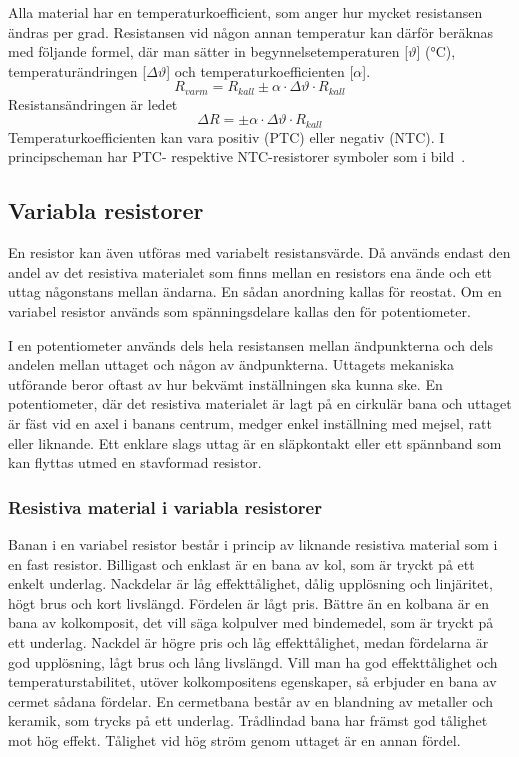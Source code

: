 Alla material har en temperaturkoefficient, som anger hur mycket resistansen
ändras per grad. Resistansen vid någon annan temperatur kan därför beräknas med
följande formel, där man sätter in begynnelsetemperaturen [\(\vartheta\)]
(\unit{\degreeCelsius}), temperaturändringen [\(\Delta \vartheta\)] och
temperaturkoefficienten [\(\alpha\)].
\[R_{varm} = R_{kall} \pm \alpha \cdot \Delta \vartheta \cdot R_{kall}\]
Resistansändringen är ledet
\[ \Delta R = \pm \alpha \cdot \Delta \vartheta \cdot R_{kall}\]
Temperaturkoefficienten kan vara positiv (PTC) eller negativ (NTC).
I principscheman har PTC- respektive NTC-resistorer symboler som i bild~.


\subsection{Variabla resistorer}

En resistor kan även utföras med variabelt resistansvärde. Då används endast
den andel av det resistiva materialet som finns mellan en resistors ena ände
och ett uttag någonstans mellan ändarna. En sådan anordning kallas för reostat.
Om en variabel resistor används som spänningsdelare kallas den för
potentiometer.

I en potentiometer används dels hela resistansen mellan ändpunkterna och dels
andelen mellan uttaget och någon av ändpunkterna.
Uttagets mekaniska utförande beror oftast av hur bekvämt inställningen ska
kunna ske.
En potentiometer, där det resistiva materialet är lagt på en cirkulär bana och
uttaget är fäst vid en axel i banans centrum, medger enkel inställning med
mejsel, ratt eller liknande.
Ett enklare slags uttag är en släpkontakt eller ett spännband som kan flyttas
utmed en stavformad resistor.

\subsubsection{Resistiva material i variabla resistorer}

Banan i en variabel resistor består i princip av liknande resistiva material som
i en fast resistor.
Billigast och enklast är en bana av kol, som är tryckt på ett enkelt underlag.
Nackdelar är låg effekttålighet, dålig upplösning och linjäritet, högt brus och
kort livslängd. Fördelen är lågt pris.
Bättre än en kolbana är en bana av kolkomposit, det vill säga kolpulver med
bindemedel, som är tryckt på ett underlag.
Nackdel är högre pris och låg effekttålighet, medan fördelarna är god
upplösning, lågt brus och lång livslängd.
Vill man ha god effekttålighet och temperaturstabilitet, utöver kolkompositens
egenskaper, så erbjuder en bana av cermet sådana fördelar.
En cermetbana består av en blandning av metaller och keramik, som trycks på ett
underlag.
Trådlindad bana har främst god tålighet mot hög effekt.
Tålighet vid hög ström genom uttaget är en annan fördel.

